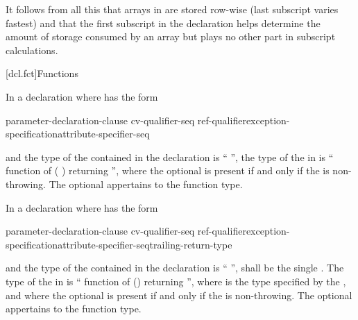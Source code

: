 \pnum
\begin{note}
It follows from all this that arrays in \Cpp are stored
row-wise (last subscript varies fastest)
%
and that the first subscript in the declaration helps determine
the amount of storage consumed by an array
but plays no other part in subscript calculations.
\end{note}

[dcl.fct]{Functions}%

\pnum
{}%
In a declaration
where
has the form

\begin{ncsimplebnf}
 parameter-declaration-clause \terminal{)} cv-qualifier-seq\opt\br
\hspace*{\bnfindentinc}ref-qualifier\opt exception-specification\opt attribute-specifier-seq\opt
\end{ncsimplebnf}

and the type of the contained
in the declaration
is
``
'',
the type of the
in
is
``
\opt
function of
( )
 
returning '',
where the optional  is present
if and only if
the  is non-throwing.
The optional 
appertains to the function type.

\pnum
In a declaration
where
has the form

\begin{ncsimplebnf}
 parameter-declaration-clause \terminal{)} cv-qualifier-seq\opt\br
\hspace*{\bnfindentinc}ref-qualifier\opt exception-specification\opt attribute-specifier-seq\opt trailing-return-type
\end{ncsimplebnf}

and the type of the contained
in the declaration
is
`` '',
 shall be the single  .
The type of the
in
is
``
\opt
function of
()
\opt {}\opt
returning '',
where  is the type specified by
the , and
where the optional  is present if and only if
the  is non-throwing.
The optional 
appertains to the function type.

